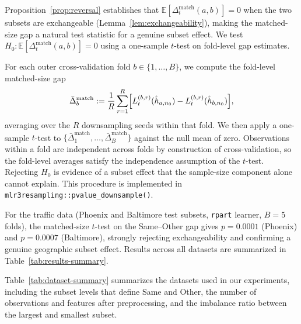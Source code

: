 \documentclass{article}
\begin{document}
Proposition~\ref{prop:reversal} establishes that $\mathbb{E}[\Delta_t^{\mathrm{match}}(a,b)] = 0$ when the two subsets are exchangeable (Lemma~\ref{lem:exchangeability}), making the matched-size gap a natural test statistic for a genuine subset effect.
We test $H_0\colon \mathbb{E}[\Delta_t^{\mathrm{match}}(a,b)] = 0$ using a one-sample $t$-test on fold-level gap estimates.

For each outer cross-validation fold $b \in \{1,\ldots,B\}$, we compute the fold-level matched-size gap
\[
\bar\Delta_b^{\mathrm{match}}
:=
\frac{1}{R}\sum_{r=1}^R
\Bigl[L_t^{(b,r)}(\hat h_{a,n_0}) - L_t^{(b,r)}(\hat h_{b,n_0})\Bigr],
\]
averaging over the $R$ downsampling seeds within that fold.
We then apply a one-sample $t$-test to $\{\bar\Delta_1^{\mathrm{match}},\ldots,\bar\Delta_B^{\mathrm{match}}\}$ against the null mean of zero.
Observations within a fold are independent across folds by construction of cross-validation, so the fold-level averages satisfy the independence assumption of the $t$-test.
Rejecting $H_0$ is evidence of a subset effect that the sample-size component alone cannot explain.
This procedure is implemented in \texttt{mlr3resampling::pvalue\_downsample()}.

For the traffic data (Phoenix and Baltimore test subsets, \texttt{rpart} learner, $B=5$ folds), the matched-size $t$-test on the Same--Other gap gives $p = 0.0001$ (Phoenix) and $p = 0.0007$ (Baltimore), strongly rejecting exchangeability and confirming a genuine geographic subset effect.
Results across all datasets are summarized in Table~\ref{tab:results-summary}.

Table~\ref{tab:dataset-summary} summarizes the datasets used in our experiments, including the subset levels that define Same and Other, the number of observations and features after preprocessing, and the imbalance ratio between the largest and smallest subset.
\end{document}
